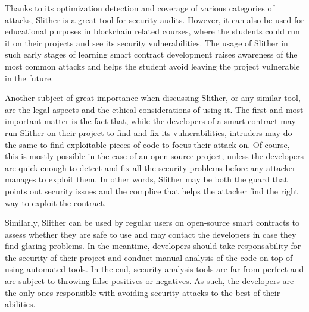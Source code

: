 Thanks to its optimization detection and coverage of various categories of attacks, Slither is a great tool for security audits. However, it can also be used for educational purposes in blockchain related courses, where the students could run it on their projects and see its security vulnerabilities. The usage of Slither in such early stages of learning smart contract development raises awareness of the most common attacks and helps the student avoid leaving the project vulnerable in the future.

Another subject of great importance when discussing Slither, or any similar tool, are the legal aspects and the ethical considerations of using it. The first and most important matter is the fact that, while the developers of a smart contract may run Slither on their project to find and fix its vulnerabilities, intruders may do the same to find exploitable pieces of code to focus their attack on. Of course, this is mostly possible in the case of an open-source project, unless the developers are quick enough to detect and fix all the security problems before any attacker manages to exploit them. In other words, Slither may be both the guard that points out security issues and the complice that helps the attacker find the right way to exploit the contract.

Similarly, Slither can be used by regular users on open-source smart contracts to assess whether they are safe to use and may contact the developers in case they find glaring problems. In the meantime, developers should take responsability for the security of their project and conduct manual analysis of the code on top of using automated tools. In the end, security analysis tools are far from perfect and are subject to throwing false positives or negatives. As such, the developers are the only ones responsible with avoiding security attacks to the best of their abilities.